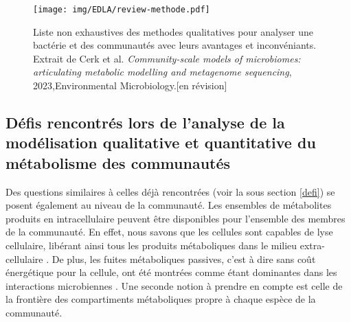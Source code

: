 \documentclass[../main.tex]{subfiles}
\begin{document}
\begin{figure}[h!]
    \centering
    \texttt{[image: img/EDLA/review-methode.pdf]}
    \caption{Liste non exhaustives des methodes qualitatives pour analyser une bactérie et des communautés avec leurs avantages et inconvéniants. Extrait de Cerk et al. \textit{Community-scale models of microbiomes: articulating metabolic modelling and metagenome sequencing}, 2023,Environmental Microbiology.[en révision]}
    \label{fig:my_label}
\end{figure}

\subsection{Défis rencontrés lors de l'analyse de la modélisation qualitative et quantitative du métabolisme des communautés}
Des questions similaires à celles déjà rencontrées (voir la sous section \ref{defi}) se posent également au niveau de la communauté. Les ensembles de métabolites produits en intracellulaire peuvent être disponibles pour l'ensemble des membres de la communauté. En effet, nous savons que les cellules sont capables de lyse cellulaire, libérant ainsi tous les produits métaboliques dans le milieu extra-cellulaire \citep{Fazzino2020}. De plus, les fuites métaboliques passives, c'est à dire sans coût énergétique pour la cellule, ont été montrées comme étant dominantes dans les interactions microbiennes  \citep{Pacheco.2019m3q}. Une seconde notion à prendre en compte est celle de la frontière des compartiments métaboliques propre à chaque espèce de la communauté. 
\end{document}
